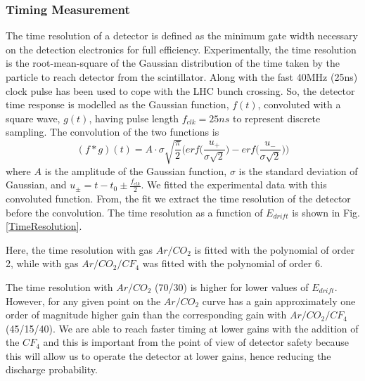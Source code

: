 \subsubsection{Timing Measurement}
The time resolution of a detector is defined as the minimum gate width necessary on the detection electronics for full efficiency.
Experimentally, the time resolution is the root-mean-square of the Gaussian distribution of the time taken by the particle to reach detector from the scintillator.
Along with the fast 40MHz (25ns) clock pulse has been used to cope with the LHC bunch crossing. So, the detector time response is modelled as the Gaussian function, $f(t)$, convoluted with a square wave, $g(t)$, having pulse length $f_{clk}=25ns$ to represent discrete sampling. 
The convolution of the two functions is
\begin{equation}
(f*g)(t) = A \cdot \sigma \sqrt{\frac{\pi}{2}}\Big(erf\Big(\frac{u_{+}}{\sigma\sqrt{2}}\Big)-erf\Big(\frac{u_{-}}{\sigma\sqrt{2}}\Big)\Big)
\end{equation}
where $A$ is the amplitude of the Gaussian function, $\sigma$ is the standard deviation of Gaussian, and $u_{\pm}= t-t_0\pm\frac{f_{clk}}{2}$. 
We fitted the experimental data with this convoluted function. From, the fit we extract the time resolution of the detector before the convolution. The time resolution as a function of $E_{drift}$ is shown in Fig. \ref{TimeResolution}. 

Here, the time resolution  with gas $Ar/CO_2$ is fitted with the polynomial of order 2, while with gas $Ar/CO_2/CF_4$ was fitted with the polynomial of order 6.

The time resolution with $Ar/CO_2$ (70/30) is higher for lower values of $E_{drift}$.
However, for any given point on the $Ar/CO_2$ curve has a gain approximately one order of magnitude higher gain than the corresponding gain with $Ar/CO_2/CF_4$ (45/15/40).  We are able to reach faster timing at lower gains with the addition of the $CF_4$ and this is important from the point of view of detector safety because this will allow us to operate the detector at lower gains, hence reducing the discharge probability.

